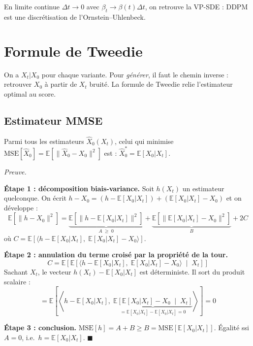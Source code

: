 \documentclass[12pt]{article}
\renewcommand{\qedsymbol}{$\blacksquare$}
\renewenvironment{proof}[1][\proofname]{%
  \par\medskip\noindent
  \textit{\color{proofgray}#1.}\enspace\ignorespaces
}{\hfill\qedsymbol\par\medskip}
\renewcommand{\proofname}{Preuve}
\begin{document}
\begin{remarkbox}
En limite continue $\Delta t \to 0$ avec $\beta_t \to \beta(t)\Delta t$, on retrouve la VP-SDE : DDPM est une discrétisation de l'Ornstein--Uhlenbeck.
\end{remarkbox}




\section{Formule de Tweedie}
\label{sec:tweedie}

On a $X_t | X_0$ pour chaque variante. Pour \textit{générer}, il faut le chemin inverse : retrouver $X_0$ à partir de $X_t$ bruité. La formule de Tweedie relie l'estimateur optimal au score.

\subsection{Estimateur MMSE}

\begin{resultbox}
\label{thm:mmse}
Parmi tous les estimateurs $\hat{X}_0(X_t)$, celui qui minimise $\mathrm{MSE}[\hat{X}_0] = \mathbb{E}[\|\hat{X}_0 - X_0\|^2]$ est : $\hat{X}_0^* = \mathbb{E}[X_0 | X_t]$.
\end{resultbox}

  \begin{proof}

\textbf{Étape 1 : décomposition biais-variance.} Soit $h(X_t)$ un estimateur quelconque. On écrit $h - X_0 = (h - \mathbb{E}[X_0|X_t]) + (\mathbb{E}[X_0|X_t] - X_0)$ et on développe :
\[
\mathbb{E}[\|h - X_0\|^2] = \underbrace{\mathbb{E}[\|h - \mathbb{E}[X_0|X_t]\|^2]}_{A \;\geq\; 0} + \underbrace{\mathbb{E}[\|\mathbb{E}[X_0|X_t] - X_0\|^2]}_{B} + 2C
\]
où $C = \mathbb{E}\!\left[\langle h - \mathbb{E}[X_0|X_t],\; \mathbb{E}[X_0|X_t] - X_0 \rangle\right]$.

\textbf{Étape 2 : annulation du terme croisé par la propriété de la tour.}
\[
C = \mathbb{E}\!\left[\mathbb{E}\!\left[\langle h - \mathbb{E}[X_0|X_t],\; \mathbb{E}[X_0|X_t] - X_0 \rangle \;\middle|\; X_t\right]\right]
\]
Sachant $X_t$, le vecteur $h(X_t) - \mathbb{E}[X_0|X_t]$ est déterministe. Il sort du produit scalaire :
\[
= \mathbb{E}\!\left[\left\langle h - \mathbb{E}[X_0|X_t],\; \underbrace{\mathbb{E}\!\left[\mathbb{E}[X_0|X_t] - X_0 \;\middle|\; X_t\right]}_{= \mathbb{E}[X_0|X_t] - \mathbb{E}[X_0|X_t] = 0} \right\rangle\right] = 0
\]

\textbf{Étape 3 : conclusion.} $\mathrm{MSE}[h] = A + B \geq B = \mathrm{MSE}[\mathbb{E}[X_0|X_t]]$. Égalité ssi $A = 0$, i.e.\ $h = \mathbb{E}[X_0|X_t]$.
\end{proof}
\end{document}
